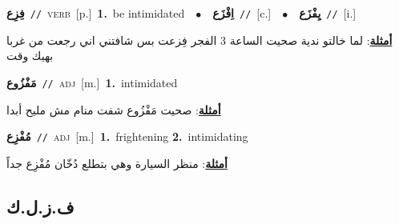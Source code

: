 \documentclass[10pt,a4paper,twoside]{article} %
\begin{document}
\begin{multicols}{2}
{\setlength\topsep{0pt}\textbf{\foreignlanguage{arabic}{فِزِع}}\ {\color{gray}\texttt{//}\color{black}}\ \textsc{verb}\ [p.]\ \textbf{1.}~be intimidated\ \ $\bullet$\ \ \setlength\topsep{0pt}\textbf{\foreignlanguage{arabic}{اِفْزَع}}\ {\color{gray}\texttt{//}\color{black}}\ [c.]\ \ $\bullet$\ \ \setlength\topsep{0pt}\textbf{\foreignlanguage{arabic}{يِفْزَع}}\ {\color{gray}\texttt{//}\color{black}}\ [i.]\  \begin{flushright}\color{gray}\foreignlanguage{arabic}{\textbf{\underline{\foreignlanguage{arabic}{أمثلة}}}: لما خالتو ندية صحيت الساعة 3 الفجر فِزعت بس شافتني اني رجعت من غربا بهيك وقت}\end{flushright}\color{black}} \vspace{2mm}

{\setlength\topsep{0pt}\textbf{\foreignlanguage{arabic}{مَفْزُوع}}\ {\color{gray}\texttt{//}\color{black}}\ \textsc{adj}\ [m.]\ \textbf{1.}~intimidated\  \begin{flushright}\color{gray}\foreignlanguage{arabic}{\textbf{\underline{\foreignlanguage{arabic}{أمثلة}}}: صحيت مَفْزُوع شفت منام مش مليح أبدا}\end{flushright}\color{black}} \vspace{2mm}

{\setlength\topsep{0pt}\textbf{\foreignlanguage{arabic}{مُفْزِع}}\ {\color{gray}\texttt{//}\color{black}}\ \textsc{adj}\ [m.]\ \textbf{1.}~frightening  \textbf{2.}~intimidating\  \begin{flushright}\color{gray}\foreignlanguage{arabic}{\textbf{\underline{\foreignlanguage{arabic}{أمثلة}}}: منظر السيارة وهي بتطلع دُخّان مُفْزِع جداً}\end{flushright}\color{black}} \vspace{2mm}

\vspace{-3mm}
\subsection*{\color{blue}\foreignlanguage{arabic}{ف.ز.ل.ك}\color{blue}{}} 


\end{multicols}
\end{document}
